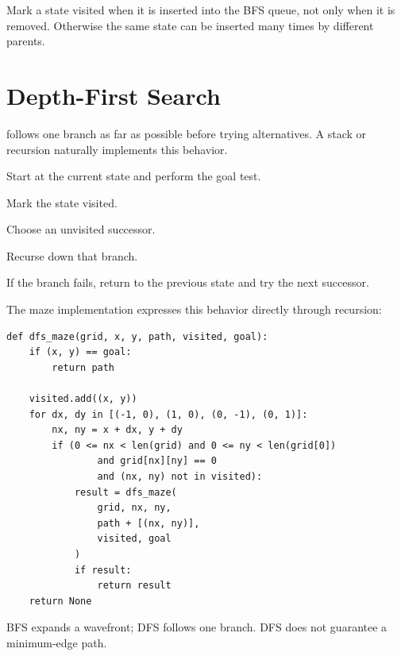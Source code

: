 \begin{pitfall}
Mark a state visited when it is inserted into the BFS queue, not only when it is removed. Otherwise the same state can be inserted many times by different parents.
\end{pitfall}

\section{Depth-First Search}

 follows one branch as far as possible before trying alternatives. A stack or recursion naturally implements this behavior.

\begin{mlsteps}
  \item Start at the current state and perform the goal test.
  \item Mark the state visited.
  \item Choose an unvisited successor.
  \item Recurse down that branch.
  \item If the branch fails, return to the previous state and try the next successor.
\end{mlsteps}

The maze implementation expresses this behavior directly through recursion:

\begin{lstlisting}[style=mlpython]
def dfs_maze(grid, x, y, path, visited, goal):
    if (x, y) == goal:
        return path

    visited.add((x, y))
    for dx, dy in [(-1, 0), (1, 0), (0, -1), (0, 1)]:
        nx, ny = x + dx, y + dy
        if (0 <= nx < len(grid) and 0 <= ny < len(grid[0])
                and grid[nx][ny] == 0
                and (nx, ny) not in visited):
            result = dfs_maze(
                grid, nx, ny,
                path + [(nx, ny)],
                visited, goal
            )
            if result:
                return result
    return None
\end{lstlisting}

\begin{intuition}
BFS expands a wavefront; DFS follows one branch. DFS does not guarantee a minimum-edge path.
\end{intuition}

